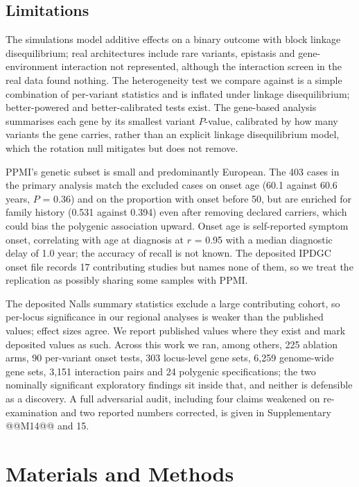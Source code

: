 \documentclass[10pt]{article}
\begin{document}
\subsection*{Limitations}

The simulations model additive effects on a binary outcome with block linkage disequilibrium; real
architectures include rare variants, epistasis and gene-environment interaction not represented,
although the interaction screen in the real data found nothing. The heterogeneity test we compare
against is a simple combination of per-variant statistics and is inflated under linkage
disequilibrium; better-powered and better-calibrated tests exist. The gene-based analysis summarises each gene by its smallest variant $P$-value, calibrated by how many variants the gene carries, rather than an explicit linkage disequilibrium
model, which the rotation null mitigates but does not remove.

PPMI's genetic subset is small and predominantly European. The 403 cases in the primary analysis
match the excluded cases on onset age (60.1 against 60.6 years, $P$ = 0.36) and on the proportion
with onset before 50, but are enriched for family history (0.531 against 0.394) even after
removing declared carriers, which could bias the polygenic association upward. Onset age is
self-reported symptom onset, correlating with age at diagnosis at $r$ = 0.95 with a median
diagnostic delay of 1.0 year; the accuracy of recall is not known. The deposited IPDGC onset file records 17 contributing studies but names none of them, so we treat the replication as possibly sharing some samples with PPMI.

The deposited Nalls summary statistics exclude a large contributing cohort, so per-locus
significance in our regional analyses is weaker than the published values; effect sizes agree. We
report published values where they exist and mark deposited values as such. Across this work we
ran, among others, 225 ablation arms, 90 per-variant onset tests, 303 locus-level gene sets, 6,259
genome-wide gene sets, 3,151 interaction pairs and 24 polygenic specifications; the two nominally
significant exploratory findings sit inside that, and neither is defensible as a discovery. A full
adversarial audit, including four claims weakened on re-examination and two reported numbers
corrected, is given in Supplementary @@M14@@ and 15.

\section*{Materials and Methods}
\end{document}
